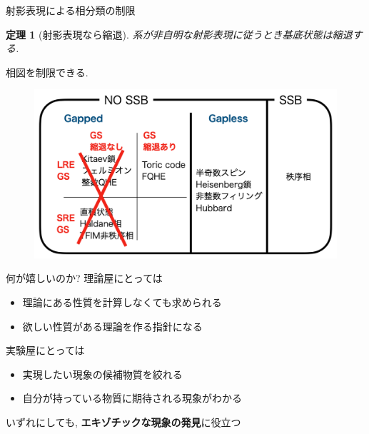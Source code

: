 \documentclass[dvipdfm]{beamer}
\newtheorem*{them}{定理}
\begin{document}



\begin{frame}{射影表現による相分類の制限}
    \begin{them}[射影表現なら縮退]
        系が非自明な射影表現に従うとき基底状態は縮退する.
    \end{them}
    相図を制限できる.
    \begin{figure}
        \centering
        \includegraphics[width=0.8\linewidth]{phaseLSM.png}
    \end{figure}
\end{frame}


\begin{frame}{何が嬉しいのか?}
    理論屋にとっては
    \begin{itemize}
        \item 理論にある性質を計算しなくても求められる
        \item 欲しい性質がある理論を作る指針になる
    \end{itemize}
    実験屋にとっては
    \begin{itemize}
        \item 実現したい現象の候補物質を絞れる
        \item 自分が持っている物質に期待される現象がわかる
    \end{itemize}
    いずれにしても, \alert{\textbf{エキゾチックな現象の発見}}に役立つ
\end{frame}
\end{document}

